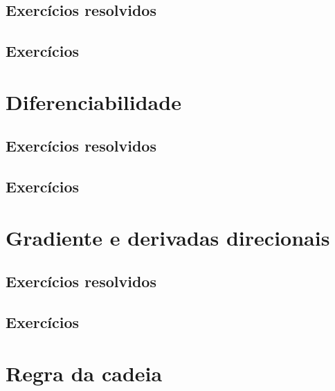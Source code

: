 \subsection*{Exercícios resolvidos}
\construirExeresol

\subsection*{Exercícios}
\construirExer

\section{Diferenciabilidade}

\subsection*{Exercícios resolvidos}
\construirExeresol

\subsection*{Exercícios}
\construirExer


\section{Gradiente e derivadas direcionais}

\subsection*{Exercícios resolvidos}
\construirExeresol

\subsection*{Exercícios}
\construirExer



\section{Regra da cadeia}

